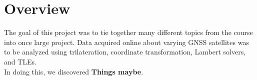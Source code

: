 \documentclass[../main.tex]{subfiles}
\begin{document}
\section{Overview}
\label{sec:overview}
The goal of this project was to tie together many different topics from the course into once large project. Data acquired online about varying GNSS satellites was to be analyzed using trilateration, coordinate transformation, Lambert solvers, and TLEs. \\

In doing this, we discovered \textbf{Things maybe}. 
\end{document}
